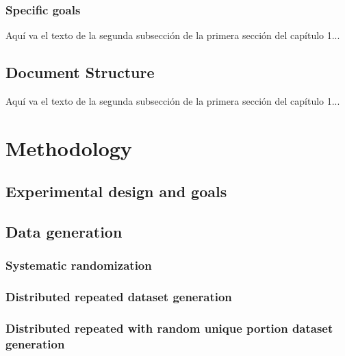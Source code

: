 \documentclass{iccmemoria}
\begin{document}
\subsection{Specific goals}
Aquí va el texto de la segunda subsección de la primera sección del capítulo 1...

\section{Document Structure}
Aquí va el texto de la segunda subsección de la primera sección del capítulo 1...



\chapter{Methodology}
\section{Experimental design and goals}
\section{Data generation}
\subsection{Systematic randomization}
\subsection{Distributed repeated dataset generation}
\subsection{Distributed repeated with random unique portion dataset generation}

\end{document}
